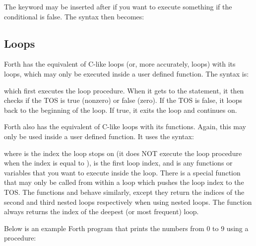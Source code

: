 \documentclass[11pt,pdftex,portrait,letterpaper]{article}
\begin{document}
\noindent{}

The  keyword may be inserted after  if you want to execute something if the conditional is false. The syntax then becomes:

\noindent{}


\subsection{Loops}
Forth has the equivalent of C-like  loops (or, more accurately,  loops) with its  loops, which may only be executed inside a user defined function. The syntax is:

\noindent{}

\noindent which first executes the loop procedure. When it gets to the  statement, it then checks if the TOS is true (nonzero) or false (zero). If the TOS is false, it loops back to the beginning of the loop. If true, it exits the loop and continues on.

Forth also has the equivalent of C-like  loops with its  functions. Again, this may only be used inside a user defined function. It uses the syntax:

\noindent{}

\noindent where  is the index the loop stops on (it does NOT execute the loop procedure when the index is equal to ),  is the first loop index, and  is any functions or variables that you want to execute inside the loop. There is a special function  that may only be called from within a loop which pushes the loop index to the TOS. The functions  and  behave similarly, except they return the indices of the second and third nested loops respectively when using nested loops. The  function always returns the index of the deepest (or most frequent) loop.

Below is an example Forth program that prints the numbers from 0 to 9 using a  procedure:

\noindent{}
\end{document}
